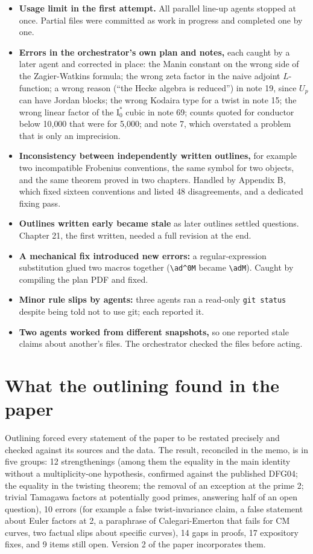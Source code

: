 \documentclass[11pt]{article}
\begin{document}
\begin{itemize}
\item \textbf{Usage limit in the first attempt.} All parallel line-up agents stopped at once. Partial files were
committed as work in progress and completed one by one.
\item \textbf{Errors in the orchestrator's own plan and notes,} each caught by a later agent and corrected in place:
the Manin constant on the wrong side of the Zagier-Watkins formula; the wrong zeta factor in the naive adjoint
$L$-function; a wrong reason (``the Hecke algebra is reduced'') in note 19, since $U_p$ can have Jordan blocks;
the wrong Kodaira type for a twist in note 15; the wrong linear factor of the $\mathrm I_0^*$ cubic in note 69;
counts quoted for conductor below 10{,}000 that were for 5{,}000; and note 7, which overstated a problem that is
only an imprecision.
\item \textbf{Inconsistency between independently written outlines,} for example two incompatible Frobenius
conventions, the same symbol for two objects, and the same theorem proved in two chapters. Handled by Appendix B,
which fixed sixteen conventions and listed 48 disagreements, and a dedicated fixing pass.
\item \textbf{Outlines written early became stale} as later outlines settled questions. Chapter 21, the first
written, needed a full revision at the end.
\item \textbf{A mechanical fix introduced new errors:} a regular-expression substitution glued two macros together
(\verb|\ad^0M| became \verb|\adM|). Caught by compiling the plan PDF and fixed.
\item \textbf{Minor rule slips by agents:} three agents ran a read-only \texttt{git status} despite being told not
to use git; each reported it.
\item \textbf{Two agents worked from different snapshots,} so one reported stale claims about another's files. The
orchestrator checked the files before acting.
\end{itemize}

\section{What the outlining found in the paper}
Outlining forced every statement of the paper to be restated precisely and checked against its sources and the
data. The result, reconciled in the memo, is in five groups: 12 strengthenings (among them the equality in the main
identity without a multiplicity-one hypothesis, confirmed against the published DFG04; the equality in the
twisting theorem; the removal of an exception at the prime 2; trivial Tamagawa factors at potentially good primes,
answering half of an open question), 10 errors (for example a false twist-invariance claim, a false statement about
Euler factors at 2, a paraphrase of Calegari-Emerton that fails for CM curves, two factual slips about specific
curves), 14 gaps in proofs, 17 expository fixes, and 9 items still open. Version 2 of the paper incorporates them.
\end{document}
